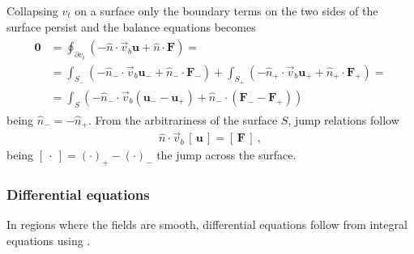 \documentclass[letterpaper,10pt,english]{jupyterBook}
\begin{document}
\sphinxAtStartPar
Collapsing \( v_t\) on a surface only the boundary terms on the two sides of the surface persist and the balance equations becomes
\begin{equation*}
\begin{split}\begin{aligned}
  \mathbf{0} 
  & = \oint_{\partial v_t} \left( - \hat{n} \cdot \vec{v}_b \mathbf{u} + \hat{n} \cdot \mathbf{F} \right) = \\
  & = \int_{S_{-}} \left( - \hat{n}_{-} \cdot \vec{v}_b \mathbf{u}_{-} + \hat{n}_{-} \cdot \mathbf{F}_{-} \right)  
    + \int_{S_{+}} \left( - \hat{n}_{+} \cdot \vec{v}_b \mathbf{u}_{+} + \hat{n}_{+} \cdot \mathbf{F}_{+} \right) = \\
  & = \int_{S} \left( - \hat{n}_{-} \cdot \vec{v}_b ( \mathbf{u}_{-} - \mathbf{u}_{+} ) + \hat{n}_{-} \cdot ( \mathbf{F}_{-} - \mathbf{F}_{+} ) \right)  
\end{aligned}\end{split}
\end{equation*}
\sphinxAtStartPar
being \(\hat{n}_{-} = - \hat{n}_{+}\). From the arbitrariness of the surface \(S\), jump relations follow
\begin{equation*}
\begin{split}\hat{n} \cdot \vec{v}_b \, \left[ \, \mathbf{u} \, \right] = \left[ \, \mathbf{F} \, \right] \ ,\end{split}
\end{equation*}
\sphinxAtStartPar
being \([ \ \cdot \ ] =  (\cdot)_{+} - (\cdot)_{-}\) the jump across the surface.


\subsubsection{Differential equations}
\label{\detokenize{ch/pde/hyperbolic-nd-draft:differential-equations}}\label{\detokenize{ch/pde/hyperbolic-nd-draft:pde-hyperbolic-nd-draft-differential}}
\sphinxAtStartPar
In regions where the fields are smooth, differential equations follow from integral equations using {\hyperref[\detokenize{ch/tensor-algebra-calculus/calculus-euclidean:tensor-calculus-integrals-theorems}]{}}.
\end{document}
